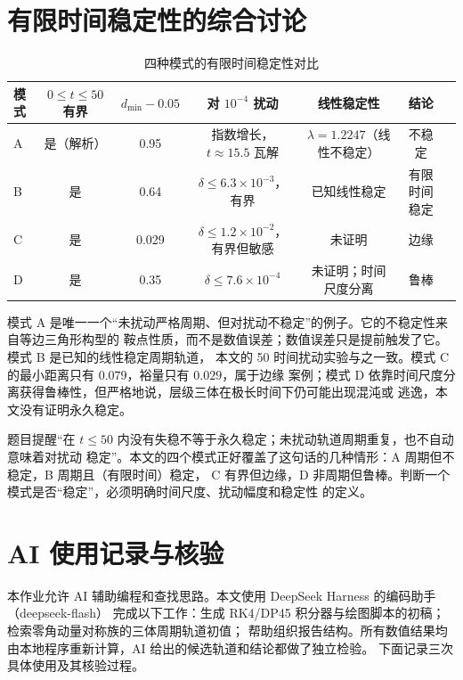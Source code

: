 \documentclass[UTF8,fontset=windows,11pt,a4paper]{ctexart}
\begin{document}
\section{有限时间稳定性的综合讨论}\label{sec:stability}
\begin{table}[H]
\centering\footnotesize
\setlength{\tabcolsep}{3pt}
\caption{四种模式的有限时间稳定性对比}
\label{tab:stability}
\begin{tabular}{@{}lcccccc@{}}
\toprule
模式 & $0\le t\le50$ 有界 & $d_{\min}-0.05$ & 对 $10^{-4}$ 扰动 & 线性稳定性 & 结论\\
\midrule
A & 是（解析） & 0.95 & 指数增长，$t\approx15.5$ 瓦解 & $\lambda=1.2247$（线性不稳定） & 不稳定\\
B & 是 & 0.64 & $\delta\le6.3\times10^{-3}$，有界 & 已知线性稳定 & 有限时间稳定\\
C & 是 & 0.029 & $\delta\le1.2\times10^{-2}$，有界但敏感 & 未证明 & 边缘\\
D & 是 & 0.35 & $\delta\le7.6\times10^{-4}$ & 未证明；时间尺度分离 & 鲁棒\\
\bottomrule
\end{tabular}
\end{table}

模式 A 是唯一一个“未扰动严格周期、但对扰动不稳定”的例子。它的不稳定性来自等边三角形构型的
鞍点性质，而不是数值误差；数值误差只是提前触发了它。模式 B 是已知的线性稳定周期轨道，
本文的 50 时间扰动实验与之一致。模式 C 的最小距离只有 $0.079$，裕量只有 $0.029$，属于边缘
案例；模式 D 依靠时间尺度分离获得鲁棒性，但严格地说，层级三体在极长时间下仍可能出现混沌或
逃逸，本文没有证明永久稳定。

题目提醒“在 $t\le50$ 内没有失稳不等于永久稳定；未扰动轨道周期重复，也不自动意味着对扰动
稳定”。本文的四个模式正好覆盖了这句话的几种情形：A 周期但不稳定，B 周期且（有限时间）稳定，
C 有界但边缘，D 非周期但鲁棒。判断一个模式是否“稳定”，必须明确时间尺度、扰动幅度和稳定性
的定义。

\section{AI 使用记录与核验}\label{sec:ai}

本作业允许 AI 辅助编程和查找思路。本文使用 DeepSeek Harness 的编码助手（deepseek-flash）
完成以下工作：生成 RK4/DP45 积分器与绘图脚本的初稿；检索零角动量对称族的三体周期轨道初值；
帮助组织报告结构。所有数值结果均由本地程序重新计算，AI 给出的候选轨道和结论都做了独立检验。
下面记录三次具体使用及其核验过程。
\end{document}
